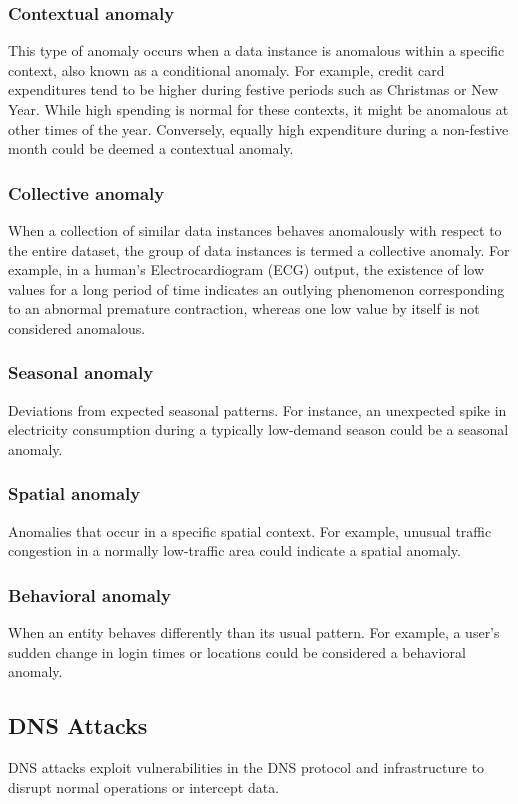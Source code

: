 \subsubsection{ Contextual anomaly}
This type of anomaly occurs when a data instance is anomalous within a specific context, also known as a conditional anomaly. For example, credit card expenditures tend to be higher during festive periods such as Christmas or New Year. While high spending is normal for these contexts, it might be anomalous at other times of the year. Conversely, equally high expenditure during a non-festive month could be deemed a contextual anomaly.

\subsubsection{ Collective anomaly}
When a collection of similar data instances behaves anomalously with respect to the entire dataset, the group of data instances is termed a collective anomaly. For example, in a human's Electrocardiogram (ECG) output, the existence of low values for a long period of time indicates an outlying phenomenon corresponding to an abnormal premature contraction, whereas one low value by itself is not considered anomalous.
\subsubsection{ Seasonal anomaly}
Deviations from expected seasonal patterns. For instance, an unexpected spike in electricity consumption during a typically low-demand season could be a seasonal anomaly.

\subsubsection{ Spatial anomaly}
Anomalies that occur in a specific spatial context. For example, unusual traffic congestion in a normally low-traffic area could indicate a spatial anomaly.

\subsubsection{ Behavioral anomaly}
When an entity behaves differently than its usual pattern. For example, a user's sudden change in login times or locations could be considered a behavioral anomaly.
\subsection{DNS Attacks}
DNS attacks exploit vulnerabilities in the DNS protocol and infrastructure to disrupt normal operations or intercept data.

